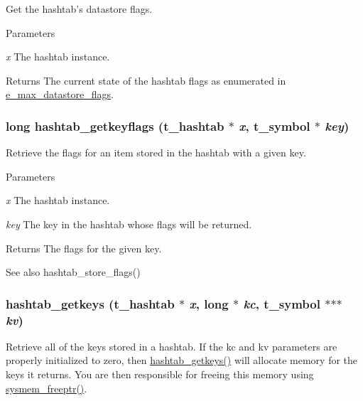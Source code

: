 Get the hashtab's datastore flags. 
\begin{DoxyParams}{Parameters}
\item[{\em x}]The hashtab instance. \end{DoxyParams}
\begin{DoxyReturn}{Returns}
The current state of the hashtab flags as enumerated in \hyperlink{group__datastore_gaa858d4b3815076d79624c39d9ca59348}{e\_\-max\_\-datastore\_\-flags}. 
\end{DoxyReturn}
\hypertarget{group__hashtab_ga3d1819d75d2b09aefae9d58fc8016cec}{
\subsubsection[{hashtab\_\-getkeyflags}]{\setlength{\rightskip}{0pt plus 5cm}long hashtab\_\-getkeyflags ({\bf t\_\-hashtab} $\ast$ {\em x}, \/  {\bf t\_\-symbol} $\ast$ {\em key})}}
\label{group__hashtab_ga3d1819d75d2b09aefae9d58fc8016cec}


Retrieve the flags for an item stored in the hashtab with a given key. 
\begin{DoxyParams}{Parameters}
\item[{\em x}]The hashtab instance. \item[{\em key}]The key in the hashtab whose flags will be returned. \end{DoxyParams}
\begin{DoxyReturn}{Returns}
The flags for the given key. 
\end{DoxyReturn}
\begin{DoxySeeAlso}{See also}
hashtab\_\-store\_\-flags() 
\end{DoxySeeAlso}
\hypertarget{group__hashtab_gaef45959b197448cfec26056d4d5656f0}{
\subsubsection[{hashtab\_\-getkeys}]{ hashtab\_\-getkeys ({\bf t\_\-hashtab} $\ast$ {\em x}, \/  long $\ast$ {\em kc}, \/  {\bf t\_\-symbol} $\ast$$\ast$$\ast$ {\em kv})}}
\label{group__hashtab_gaef45959b197448cfec26056d4d5656f0}


Retrieve all of the keys stored in a hashtab. If the kc and kv parameters are properly initialized to zero, then \hyperlink{group__hashtab_gaef45959b197448cfec26056d4d5656f0}{hashtab\_\-getkeys()} will allocate memory for the keys it returns. You are then responsible for freeing this memory using \hyperlink{group__memory_ga200c82639e547869db1f3887d17102d3}{sysmem\_\-freeptr()}.


